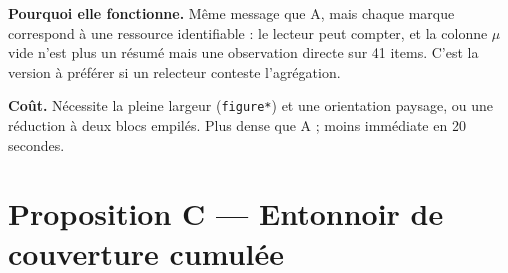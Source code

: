 \documentclass[10pt]{article}
\newcommand{\yes}{\textcolor{clrLD}{$\blacksquare$}}
\newcommand{\hf}{\textcolor{clrO}{$\square$}}
\newcommand{\no}{\textcolor{clrG!45}{$\cdot$}}
\begin{document}
\begin{center}
{}
\end{center}

\vspace{2pt}
\noindent\textbf{Pourquoi elle fonctionne.} M\^eme message que A, mais chaque marque correspond \`a une
ressource identifiable : le lecteur peut compter, et la colonne $\mu$ vide n'est plus un r\'esum\'e mais une
observation directe sur 41 items. C'est la version \`a pr\'ef\'erer si un relecteur conteste l'agr\'egation.

\medskip
\noindent\textbf{Co\^ut.} N\'ecessite la pleine largeur (\texttt{figure*}) et une orientation paysage, ou une
r\'eduction \`a deux blocs empil\'es. Plus dense que A ; moins imm\'ediate en 20 secondes.

\clearpage

\section*{Proposition C --- Entonnoir de couverture cumul\'ee}
\end{document}
